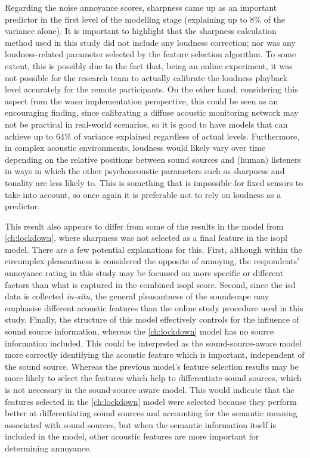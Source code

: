 Regarding the noise annoyance scores, sharpness came up as an important predictor in the first level of the modelling stage (explaining up to 8\% of the variance alone). It is important to highlight that the sharpness calculation method used in this study did not include any loudness correction; nor was any loudness-related parameter selected by the feature selection algorithm. To some extent, this is possibly due to the fact that, being an online experiment, it was not possible for the research team to actually calibrate the loudness playback level accurately for the remote participants. On the other hand, considering this aspect from the \gls{wasn} implementation perspective, this could be seen as an encouraging finding, since calibrating a diffuse acoustic monitoring network may not be practical in real-world scenarios, so it is good to have models that can achieve up to 64\% of variance explained regardless of actual levels. Furthermore, in complex acoustic environments, loudness would likely vary over time depending on the relative positions between sound sources and (human) listeners in ways in which the other psychoacoustic parameters such as sharpness and tonality are less likely to. This is something that is impossible for fixed sensors to take into account, so once again it is preferable not to rely on loudness as a predictor.

This result also appears to differ from some of the results in the model from \cref{ch:lockdown}, where sharpness was not selected as a final feature in the \gls{isopl} model. There are a few potential explanations for this. First, although within the circumplex pleasantness is considered the opposite of annoying, the respondents' annoyance rating in this study may be focussed on more specific or different factors than what is captured in the combined \gls{isopl} score. Second, since the \gls{isd} data is collected \emph{in-situ}, the general pleasantness of the soundscape may emphasise different acoustic features than the online study procedure used in this study. Finally, the structure of this model effectively controls for the influence of sound source information, whereas the \cref{ch:lockdown} model has no source information included. This could be interpreted as the sound-source-aware model more correctly identifying the acoustic feature which is important, independent of the sound source. Whereas the previous model's feature selection results may be more likely to select the features which help to differentiate sound sources, which is not necessary in the sound-source-aware model. This would indicate that the features selected in the \cref{ch:lockdown} model were selected because they perform better at differentiating sound sources and accounting for the semantic meaning associated with sound sources, but when the semantic information itself is included in the model, other acoustic features are more important for determining annoyance. 

